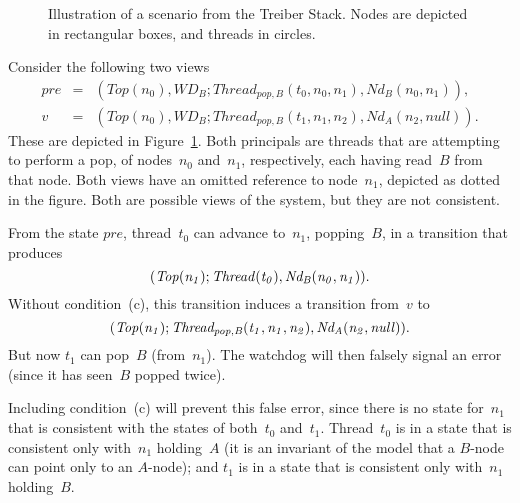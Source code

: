 {%

\begin{figure}\small
\def\addLabel#1#2{\draw #1++(0,0.5) node {#2};}
\begin{center}
\end{center}
\caption{Illustration of a scenario from the Treiber Stack.  Nodes are
  depicted in rectangular boxes, and threads in circles.}
\label{fig:missingCommon}
\end{figure}


Consider the following two views
%
\begin{eqnarray*}
pre & = &  (Top(n_0), WD_B; Thread_{pop,B}(t_0, n_0, n_1), Nd_B(n_0, n_1)), \\
v & = & (Top(n_0), WD_B; Thread_{pop,B}(t_1, n_1, n_2), Nd_A(n_2, null)).
\end{eqnarray*}
%
These are depicted in Figure~\ref{fig:missingCommon}.  Both principals are
threads that are attempting to perform a pop, of nodes~$n_0$ and~$n_1$,
respectively, each having read~$B$ from that node.  Both views have an omitted
reference to node~$n_1$, depicted as dotted in the figure.  Both are possible
views of the system, but they are not consistent.

From the state $pre$, thread~$t_0$ can advance  to~$n_1$,
popping~$B$, in a transition that produces
\[\mit
(Top(n_1); Thread(t_0), Nd_B(n_0, n_1)).
\]
Without condition~(c), this transition  induces a transition from~$v$ to
\[\mit
(Top(n_1); Thread_{pop,B}(t_1, n_1, n_2), Nd_A(n_2, null)).
\]
But now $t_1$ can pop~$B$ (from~$n_1$).  The watchdog will then falsely signal
an error (since it has seen~$B$ popped twice). 

Including condition~(c) will prevent this false error, since there is no state
for~$n_1$ that is consistent with the states of both~$t_0$ and~$t_1$.
Thread~$t_0$ is in a state that is consistent only with~$n_1$ holding~$A$ (it
is an invariant of the model that a $B$-node can point only to an $A$-node);
and $t_1$ is in a state that is consistent only with~$n_1$ holding~$B$.

}
